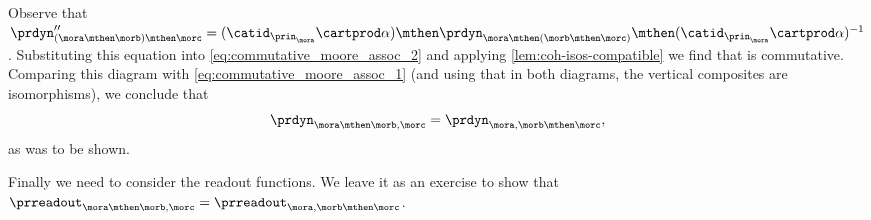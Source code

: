 Observe that $\prdyn''_{(\mora \mthen \morb) \mthen \morc} =  (\catid_{\prin_{\mora}} \cartprod \alpha) \mthen \prdyn_{\mora \mthen (\morb \mthen \morc)} \mthen (\catid_{\prin_{\mora}} \cartprod \alpha)^{-1}$. Substituting this equation into \cref{eq:commutative_moore_assoc_2} and applying \cref{lem:coh-isos-compatible} we find that 
is commutative. Comparing this diagram with \cref{eq:commutative_moore_assoc_1} (and using that in both diagrams, the vertical composites are isomorphisms), we conclude that 
\begin{equation*}
\prdyn_{\mora \mthen \morb, \morc} = \prdyn_{\mora, \morb \mthen \morc},
\end{equation*}
as was to be shown. 



    Finally we need to consider the readout functions. We leave it as an exercise to show that $\prreadout_{\mora \mthen \morb, \morc} = \prreadout_{\mora, \morb \mthen \morc}$.
    
    
%  
    
    
    
